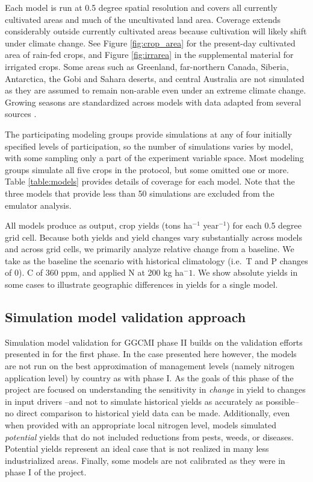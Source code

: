 \documentclass[preprint, 5p, times, twocolumn]{elsarticle}
\begin{document}
{Each model is run at 0.5 degree spatial resolution and covers all currently cultivated areas and much of the uncultivated land area.  Coverage extends considerably outside currently cultivated areas because cultivation will likely shift under climate change. See Figure \ref{fig:crop_area} for the present-day cultivated area of rain-fed crops, and Figure \ref{fig:irrarea} in the supplemental material for irrigated crops. Some areas such as Greenland, far-northern Canada, Siberia, Antarctica, the Gobi and Sahara deserts, and central Australia are not simulated as they are assumed to remain non-arable even under an extreme climate change. Growing seasons are standardized across models with data adapted from several sources \citep{Sacks2010, Portmann2008, Portmann2010}.

The participating modeling groups provide simulations at any of four initially specified levels of participation, so the number of simulations varies by model, with some sampling only a part of the experiment variable space. Most modeling groups simulate all five crops in the protocol, but some omitted one or more. Table \ref{table:models} provides details of coverage for each model. Note that the three models that provide less than 50 simulations are excluded from the emulator analysis. 

All models produce as output, crop yields (tons ha$^{-1}$ year$^{-1}$) for each 0.5 degree grid cell. Because both yields and yield changes vary substantially across models and across grid cells, we primarily analyze relative change from a baseline. We take as the baseline the scenario with historical climatology (i.e.\ T and P changes of 0). C of 360 ppm, and applied N at 200 kg ha$^-1$.  We show absolute yields in some cases to illustrate geographic differences in yields for a single model. 

\subsection{Simulation model validation approach}
Simulation model validation for GGCMI phase II builds on the validation efforts presented in \citet{muller_global_2017} for the first phase. In the case presented here however, the models are not run on the best approximation of management levels (namely nitrogen application level) by country as with phase I. As the goals of this phase of the project are focused on understanding the sensitivity in \textit{change} in yield to changes in input drivers --and not to simulate historical yields as accurately as possible-- no direct comparison to historical yield data can be made. Additionally, even when provided with an appropriate local nitrogen level, models simulated \textit{potential} yields that do not included reductions from pests, weeds, or diseases. Potential yields represent an ideal case that is not realized in many less industrialized areas. Finally, some models are not calibrated as they were in phase I of the project.

}
\end{document}
